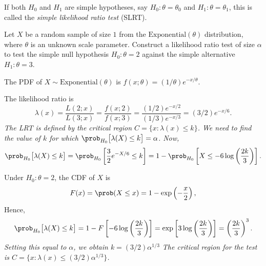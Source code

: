 If both $H_0$ and $H_1$ are simple hypotheses, say $H_0:\theta=\theta_0$ and $H_1:\theta=\theta_1$, this is called the \emph{simple likelihood ratio test} (SLRT).

\begin{example}
Let $X$ be a random sample of size $1$ from the $\text{Exponential}(\theta)$ distribution, where $\theta$ is an unknown scale parameter. Construct a likelihood ratio test of size $\alpha$ to test the simple null hypothesis $H_0:\theta=2$ against the simple alternative $H_1:\theta=3$.
\end{example}

\begin{solution}
The PDF of $X\sim\text{Exponential}(\theta)$ is $f(x;\theta) = (1/\theta)e^{-x/\theta}$.


The likelihood ratio is
\[
\lambda(x) = \frac{L(2;x)}{L(3;x)} = \frac{f(x;2)}{f(x;3)} = \frac{(1/2)e^{-x/2}}{(1/3)e^{-x/3}} = (3/2)e^{-x/6}.
\]
\bit 
\it The LRT is defined by the critical region $C = \{x:\lambda(x)\leq k\}$.
\it We need to find the value of $k$ for which $\prob_{H_0}\big[\lambda(X)\leq k\big] = \alpha$.
\eit
Now,
\[
\prob_{H_0}\big[\lambda(X)\leq k\big]
	= \prob_{H_0}\left[\frac{3}{2} e^{-X/6} \leq k\right] 
	= 1 - \prob_{H_0}\left[X \leq -6\log\left(\frac{2k}{3}\right)\right].
\]

Under $H_0:\theta=2$, the CDF of $X$ is 
\[
F(x)=\prob(X\leq x)=1-\exp\left(-\frac{x}{2}\right),
\]
Hence,
\[
\prob_{H_0}\big[\lambda(X)\leq k\big]
	= 1 - F\left[-6\log\left(\frac{2k}{3}\right)\right] 
	= \exp\left[3\log\left(\frac{2k}{3}\right)\right] 
	= \left(\frac{2k}{3}\right)^3.
\]
\bit
\it Setting this equal to $\alpha$, we obtain $k=(3/2)\alpha^{1/3}$
\it The critical region for the test is $C = \{x:\lambda(x)\leq (3/2)\alpha^{1/3}\}$.
\eit
\end{solution}


